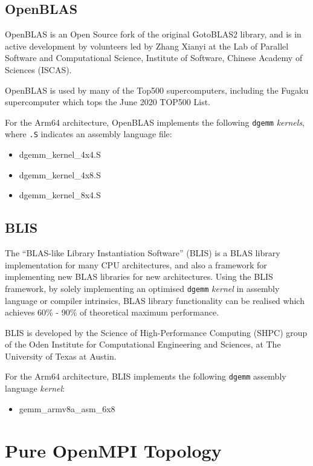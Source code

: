 \documentclass{report}
\begin{document}
%
%
\subsection{OpenBLAS}

OpenBLAS is an Open Source fork of the original GotoBLAS2 library, and is in active development by volunteers led by Zhang Xianyi at the Lab of Parallel Software and Computational Science, Institute of Software, Chinese Academy of Sciences (ISCAS).

OpenBLAS is used by many of the Top500 supercomputers, including the Fugaku supercomputer which tops the June 2020 TOP500 List.

For the Arm64 architecture, OpenBLAS implements the following \verb|dgemm| \emph{kernels}, where \verb|.S| indicates an assembly language file:

\begin{itemize}
  \item dgemm\_kernel\_4x4.S
  \item dgemm\_kernel\_4x8.S
  \item dgemm\_kernel\_8x4.S 
\end{itemize}


%
%
\subsection{BLIS}

The ``BLAS-like Library Instantiation Software'' (BLIS) is a BLAS library implementation for many CPU architectures, and also a framework for implementing new BLAS libraries for new architectures. Using the BLIS framework, by solely implementing an optimised \verb|dgemm| \emph{kernel} in assembly language or compiler intrinsics, BLAS library functionality can be realised which achieves 60\% - 90\% of theoretical maximum performance.

BLIS is developed by the Science of High-Performance Computing (SHPC) group of the Oden Institute for Computational Engineering and Sciences, at The University of Texas at Austin.

For the Arm64 architecture, BLIS implements the following \verb|dgemm| assembly language \emph{kernel}:

\begin{itemize}
  \item gemm\_armv8a\_asm\_6x8
\end{itemize}


%
%
\section{Pure OpenMPI Topology}
\end{document}
